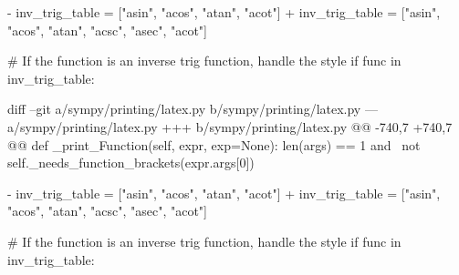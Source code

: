 {\begin{observationbox}
\begin{CodeVerbatim}[breaklines=true, breakanywhere=true]
-            inv_trig_table = ["asin", "acos", "atan", "acot"]
+            inv_trig_table = ["asin", "acos", "atan", "acsc", "asec", "acot"]
 
             # If the function is an inverse trig function, handle the style
             if func in inv_trig_table:
\end{CodeVerbatim}
\end{observationbox}

\begin{goldpatchbox}
\begin{CodeVerbatim}[breaklines=true, breakanywhere=true]
diff --git a/sympy/printing/latex.py b/sympy/printing/latex.py
--- a/sympy/printing/latex.py
+++ b/sympy/printing/latex.py
@@ -740,7 +740,7 @@ def _print_Function(self, expr, exp=None):
                 len(args) == 1 and \
                 not self._needs_function_brackets(expr.args[0])
 
-            inv_trig_table = ["asin", "acos", "atan", "acot"]
+            inv_trig_table = ["asin", "acos", "atan", "acsc", "asec", "acot"]
 
             # If the function is an inverse trig function, handle the style
             if func in inv_trig_table:
\end{CodeVerbatim}
\end{goldpatchbox}
}